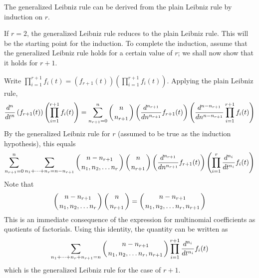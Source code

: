\documentclass[12pt]{article}
\begin{document}
The generalized Leibniz rule can be derived from the plain Leibniz rule by induction on $r$.

If $r=2$, the generalized Leibniz rule reduces to the plain Leibniz rule.  This will be the starting point for the induction.  To complete the induction, assume that the generalized Leibniz rule holds for a certain value of $r$; we shall now show that it holds for $r+1$.

Write $\prod_{i=1}^{r+1} f_i(t) = \left( f_{r+1} (t) \right) \left( \prod_{i=1}^{r+1} f_i(t) \right)$.  Applying the plain Leibniz rule,
 $${d^n \over dt^n} \left( f_{r+1} (t) \right) \left( \prod_{i=1}^{r+1} f_i(t) \right) = \sum_{n_{r+1}=0}^n \left( {n \atop n_{r+1}} \right) \left( {d^{n_{r+1}} \over dn^{n_{r+1}}} f_{r+1} (t) \right) \left( {d^{n - n_{r+1}} \over dn^{n - n_{r+1}}}\prod_{i=1}^{r+1} f_i(t) \right)$$
By the generalized Leibniz rule for $r$ (assumed to be true as the induction hypothesis), this equals
 $$\sum_{n_{r+1}=0}^n \sum_{n_1 + \cdots + n_r = n - n_{r+1}} \left( {n - n_{r+1}\atop n_1, n_2, \ldots n_r}  \right) \left( {n \atop n_{r+1}} \right) \left( {d^{n_{r+1}} \over dn^{n_{r+1}}} f_{r+1} (t) \right) \left( \prod_{i=1}^r {d^{n_i} \over dt^{n_i}} f_i(t) \right)$$
Note that
 $$\left( {n - n_{r+1}\atop n_1, n_2, \ldots n_r}  \right) \left( {n \atop n_{r+1}} \right) = \left( {n - n_{r+1}\atop n_1, n_2, \ldots n_r, n_{r+1}}  \right)$$
This is an immediate consequence of the expression for multinomial coefficients as quotients of factorials.  Using this identity, the quantity can be written as
 $$\sum_{n_1 + \cdots + n_r + n_{r+1} = n} \left( {n - n_{r+1}\atop n_1, n_2, \ldots n_r, n_{r+1}} \right) \prod_{i=1}^{r+1} {d^{n_i} \over dt^{n_i}} f_i(t)$$
which is the generalized Leibniz rule for the case of $r+1$.
\end{document}
